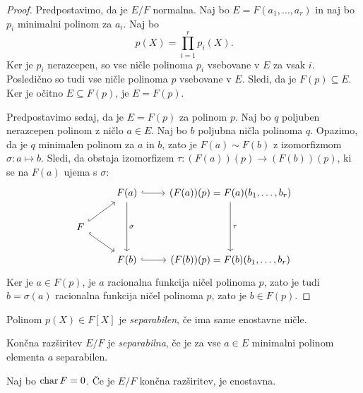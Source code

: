 \begin{proof}
Predpostavimo, da je $E/F$ normalna. Naj bo
$E = F(a_1, \dots, a_r)$ in naj bo $p_i$ minimalni polinom za
$a_i$. Naj bo
\[
p(X) = \prod_{i=1}^r p_i(X).
\]
Ker je $p_i$ nerazcepen, so vse ničle polinoma $p_i$ vsebovane v
$E$ za vsak $i$. Posledično so tudi vse ničle polinoma $p$
vsebovane v $E$. Sledi, da je $F(p) \subseteq E$. Ker je očitno
$E \subseteq F(p)$, je $E = F(p)$.

Predpostavimo sedaj, da je $E = F(p)$ za polinom $p$. Naj bo
$q$ poljuben nerazcepen polinom z ničlo $a \in E$. Naj bo $b$
poljubna ničla polinoma $q$. Opazimo, da je $q$ minimalen polinom
za $a$ in $b$, zato je $F(a) \sim F(b)$ z izomorfizmom
$\sigma \colon a \mapsto b$. Sledi, da obstaja izomorfizem
$\tau \colon (F(a))(p) \to (F(b))(p)$, ki se na $F(a)$ ujema s
$\sigma$:
\[
\begin{tikzcd}
& {F(a)} & {(F(a))(p) = F(a)(b_1, \dots, b_r)} \\
F \\
& {F(b)} & {(F(b))(p) = F(b)(b_1, \dots, b_r)}
\arrow[hook, from=2-1, to=1-2]
\arrow[hook, from=2-1, to=3-2]
\arrow["\sigma", from=1-2, to=3-2]
\arrow[hook, from=1-2, to=1-3]
\arrow[hook, from=3-2, to=3-3]
\arrow["\tau", from=1-3, to=3-3]
\end{tikzcd}
\]
Ker je $a \in F(p)$, je $a$ racionalna funkcija ničel polinoma $p$,
zato je tudi $b = \sigma(a)$ racionalna funkcija ničel polinoma
$p$, zato je $b \in F(p)$.
\end{proof}

\begin{definicija}
Polinom $p(X) \in F[X]$ je
\emph{separabilen}, če ima same
enostavne ničle.
\end{definicija}

\begin{definicija}
Končna razširitev $E/F$ je
\emph{separabilna}, če je za
vse $a \in E$ minimalni polinom elementa $a$ separabilen.
\end{definicija}

\begin{izrek}
\label{gal:iz:1}
Naj bo $\operatorname{char} F = 0$. Če je $E/F$ končna razširitev, je enostavna.
\end{izrek}


